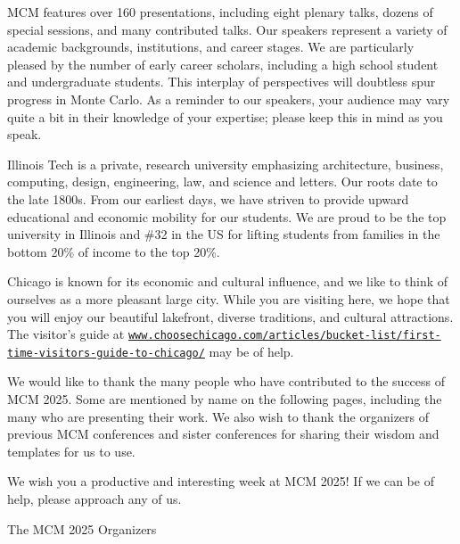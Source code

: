 \documentclass[12pt,lettersize,oneside]{book} %
\begin{document}
MCM features over 160 presentations, including eight plenary talks,  dozens of special sessions, and many contributed talks.  Our speakers represent a variety of academic backgrounds, institutions, and career stages.  We are particularly pleased by the number of early career scholars, including a high school student and  undergraduate students.  This interplay of perspectives will doubtless spur progress in Monte Carlo.  As a reminder to our speakers, your audience may vary quite a bit in their knowledge of your expertise; please keep this in mind as you speak.

Illinois Tech is a private, research university emphasizing architecture, business, computing, design, engineering, law, and science and letters.  Our roots date to the late 1800s.  From our earliest days, we have striven to provide upward educational and economic mobility for our students.  We are proud to be the top university in Illinois and \#32 in the US for lifting students from families in the bottom 20\% of income to the top 20\%.

Chicago is known for its economic and cultural influence, and we like to think of ourselves as a more pleasant large city.
While you are visiting here, we hope that you will enjoy our beautiful lakefront, diverse traditions, and cultural attractions. The visitor's guide at \href{https://www.choosechicago.com/articles/bucket-list/first-time-visitors-guide-to-chicago/}{\nolinkurl{www.choosechicago.com/articles/bucket-list/first-time-visitors-guide-to-chicago/}} may be of help.

We would like to thank the many people who have contributed to the success of MCM 2025.  Some are mentioned by name on the following pages, including the many who are presenting their work.  We also wish to thank the organizers of previous MCM conferences and sister conferences for sharing their wisdom and templates for us to use.

We wish you a productive and interesting week at MCM 2025! If we can be of help, please approach any of us.


\vspace{1.5ex}

The MCM 2025 Organizers

\vspace{0.2ex}


\end{document}
